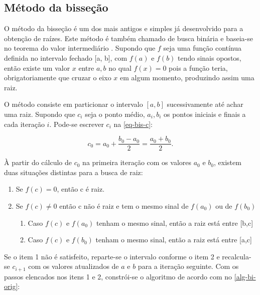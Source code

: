 


% 
\subsection{Método da bisseção}


O método da bisseção é um dos mais antigos e simples já desenvolvido para a obtenção de raízes. Este método é também chamado de busca binária e baseia-se no teorema do valor intermediário \cite{numerical-anal-burden}. Supondo que $f$ seja uma função contínua definida no intervalo fechado [a, b], com $f(a)$ e $f(b)$ tendo sinais opostos, então existe um valor $x$ entre $a,b$ no qual $f(x) = 0$ pois a função teria, obrigatoriamente que cruzar o eixo $x$ em algum momento, produzindo assim uma raiz.

O método consiste em particionar o intervalo $[a,b]$ sucessivamente até achar uma raiz. Supondo que $c_i$ seja o ponto médio, $a_i, b_i$ os pontos iniciais e finais a cada iteração $i$. Pode-se escrever $c_i$ na \autoref{eq-bis-c}:

\begin{equation}
    c_0 = a_0 + \frac{b_0 - a_0}{2} = \frac{a_0 + b_0}{2}.
    \label{eq-bis-c}
\end{equation}

À partir do cálculo de $c_0$ na primeira iteração com os valores $a_0$ e $b_0$, existem duas situações distintas para a busca de raiz:

\begin{enumerate}
    \item Se $f(c) = 0$, então c é raiz.
    \item Se $f(c) \neq 0$ então c não é raiz e tem o mesmo sinal de $f(a_0)$ ou de $f(b_0)$
    \begin{enumerate}
        \item Caso $f(c)$ e $f(a_0)$ tenham o mesmo sinal, então a raiz está entre [b,c]
        \item Caso $f(c)$ e $f(b_0)$ tenham o mesmo sinal, então a raiz está entre [a,c]
    \end{enumerate}
\end{enumerate}

Se o item 1 não é satisfeito, reparte-se o intervalo conforme o item 2 e recalcula-se $c_{i+1}$ com  os valores atualizados de $a$ e $b$ para a iteração seguinte. Com os passos elencados nos itens 1 e 2, constrói-se o algoritmo de acordo com \citeauthor{numerical-anal-burden} no \autoref{alg-bi-orig}:



